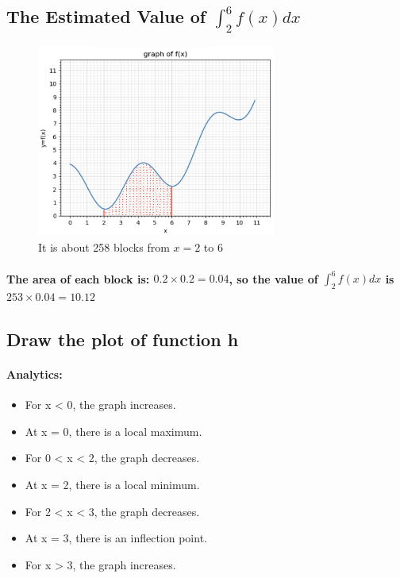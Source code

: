 \subsection{The Estimated Value of $\int^6_2 f(x)dx$}
\begin{figure}[H]
    \centering
    \includegraphics[width=0.7\textwidth]{pic/q2b.jpeg}
    \caption{It is about 258 blocks from $x=2$ to $6$}
\end{figure}
% 
% 
% 
\paragraph{The area of each block is: $0.2 \times 0.2 = 0.04$, so the value of $ \int^6_2 f(x)dx $ is $ 253 \times 0.04 = \mathbf{10.12} $}
% 
% 
% 
% 
% 
% 
% 
% 
% 
\subsection{Draw the plot of function h}
% 

% 
% 
\paragraph{\textbf{Analytics:}}
\begin{itemize}
    \item For x < 0, the graph increases.
    \item At x = 0, there is a local maximum.
    \item For 0 < x < 2, the graph decreases.
    \item At x = 2, there is a local minimum.
    \item For 2 < x < 3, the graph decreases.
    \item At x = 3, there is an inflection point.
    \item For x > 3, the graph increases.
\end{itemize}
% 
% 
% 
% 
